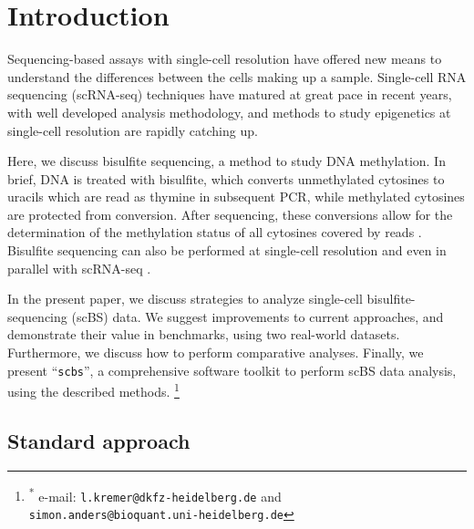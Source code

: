\documentclass[twocolumn,10pt]{article}
\newcommand\blfootnote[1]{%
    \begingroup
    \renewcommand\thefootnote{}\footnote{#1}%
    \addtocounter{footnote}{-1}%
    \endgroup
}
\begin{document}
\section{Introduction}

Sequencing-based assays with single-cell resolution have offered new means to understand the differences between the cells making up a sample.
Single-cell RNA sequencing (scRNA-seq) techniques have matured at great pace in recent years, with well developed analysis methodology, and methods to study epigenetics at single-cell resolution are rapidly catching up.


Here, we discuss bisulfite sequencing, a method to study DNA methylation.
In brief, DNA is treated with bisulfite, which converts unmethylated cytosines to uracils which are read as thymine in subsequent PCR, while methylated cytosines are protected from conversion.
After sequencing, these conversions allow for the determination of the methylation status of all cytosines covered by reads \citep{Frommer_1992}.
Bisulfite sequencing can also be performed at single-cell resolution \citep{Smallwood_2014} and even in parallel with scRNA-seq \citep{scMTseq,Clark2018}.

In the present paper, we discuss strategies to analyze single-cell bisulfite-sequencing (scBS) data.
We suggest improvements to current approaches, and demonstrate their value in benchmarks, using two real-world datasets.
Furthermore, we discuss how to perform comparative analyses.
Finally, we present ``\texttt{scbs}'', a comprehensive software toolkit to perform scBS data analysis, using the described methods.
\blfootnote{\hspace{-.5cm}\raggedright\textsuperscript{*} e-mail:  \texttt{l.kremer@dkfz-heidelberg.de} and\\ \hspace{1cm}\texttt{simon.anders@bioquant.uni-heidelberg.de}}


\subsection{Standard approach}
\end{document}
